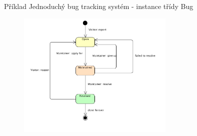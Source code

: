 \begin{frame}{Příklad}
Jednoduchý bug tracking systém - instance třídy Bug
\begin{figure}
	\includegraphics[width=75mm]{img/diagramy/StateMachine/bugtracker.png}
\end{figure}

\end{frame}


